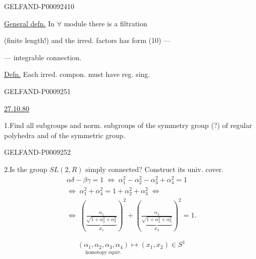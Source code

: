 \begin{GelfandAdjacentEvidence}{GELFAND-P000924}{10}


\underline{General defn.} In $\forall$ module there is a filtration

(finite length!) and the irred. factors has form (10) ---

--- integrable connection.
\end{GelfandAdjacentEvidence}


\underline{Defn.} Each irred. compon. must have reg. sing.


\begin{GelfandAdjacentEvidence}{GELFAND-P000925}{1}

\underline{27.10.80}\qquad{}


1.\enspace Find all subgroups and norm. subgroups of the symmetry group (?) of regular polyhedra and of the symmetric group.
\end{GelfandAdjacentEvidence}
\begin{GelfandAdjacentEvidence}{GELFAND-P000925}{2}


2.\enspace Is the group $SL(2,R)$ simply connected? Construct its univ. cover.
\begin{gather*}
 \alpha\delta-\beta\gamma=1
 \;\Longleftrightarrow\;
 \alpha_1^2-\alpha_2^2-\alpha_3^2+\alpha_4^2=1\\
 \Longleftrightarrow\;
 \alpha_1^2+\alpha_4^2=1+\alpha_2^2+\alpha_3^2
 \;\Longleftrightarrow\\
 \Longleftrightarrow\;
 \left(\underbrace{\frac{\alpha_1}{\sqrt{1+\alpha_2^2+\alpha_3^2}}}_{x_1}\right)^2+
 \left(\underbrace{\frac{\alpha_4}{\sqrt{1+\alpha_2^2+\alpha_3^2}}}_{x_2}\right)^2=1.
\end{gather*}
\end{GelfandAdjacentEvidence}


\[
 \underset{\text{homotopy equiv.}}{(\alpha_1,\alpha_2,\alpha_3,\alpha_4)}
 \longmapsto (x_1,x_2)\in S^1
\]

